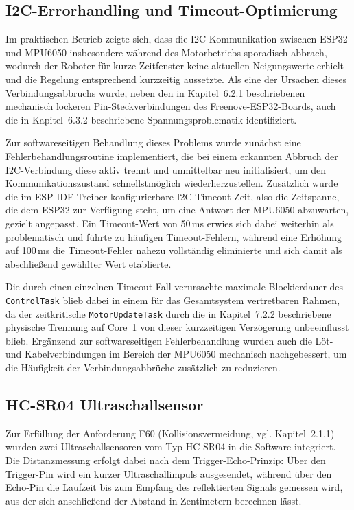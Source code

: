\documentclass[12pt,ngerman,numbers=noenddot,abstracton,headsepline]{scrreprt}
\begin{document}
\subsection{I2C-Errorhandling und Timeout-Optimierung}
\label{subsec:i2c_errorhandling}

Im praktischen Betrieb zeigte sich, dass die I2C-Kommunikation zwischen ESP32 und MPU6050 insbesondere während des Motorbetriebs sporadisch abbrach, wodurch der Roboter für kurze Zeitfenster keine aktuellen Neigungswerte erhielt und die Regelung entsprechend kurzzeitig aussetzte. Als eine der Ursachen dieses Verbindungsabbruchs wurde, neben den in Kapitel~6.2.1 beschriebenen mechanisch lockeren Pin-Steckverbindungen des Freenove-ESP32-Boards, auch die in Kapitel~6.3.2 beschriebene Spannungsproblematik identifiziert.

Zur softwareseitigen Behandlung dieses Problems wurde zunächst eine Fehlerbehandlungsroutine implementiert, die bei einem erkannten Abbruch der I2C-Verbindung diese aktiv trennt und unmittelbar neu initialisiert, um den Kommunikationszustand schnellstmöglich wiederherzustellen. Zusätzlich wurde die im ESP-IDF-Treiber konfigurierbare I2C-Timeout-Zeit, also die Zeitspanne, die dem ESP32 zur Verfügung steht, um eine Antwort der MPU6050 abzuwarten, gezielt angepasst. Ein Timeout-Wert von 50\,ms erwies sich dabei weiterhin als problematisch und führte zu häufigen Timeout-Fehlern, während eine Erhöhung auf 100\,ms die Timeout-Fehler nahezu vollständig eliminierte und sich damit als abschließend gewählter Wert etablierte.

Die durch einen einzelnen Timeout-Fall verursachte maximale Blockierdauer des \texttt{ControlTask} blieb dabei in einem für das Gesamtsystem vertretbaren Rahmen, da der zeitkritische \texttt{MotorUpdateTask} durch die in Kapitel~7.2.2 beschriebene physische Trennung auf Core~1 von dieser kurzzeitigen Verzögerung unbeeinflusst blieb. Ergänzend zur softwareseitigen Fehlerbehandlung wurden auch die Löt- und Kabelverbindungen im Bereich der MPU6050 mechanisch nachgebessert, um die Häufigkeit der Verbindungsabbrüche zusätzlich zu reduzieren.

\subsection{HC-SR04 Ultraschallsensor}
\label{subsec:hcsr04}

Zur Erfüllung der Anforderung F60 (Kollisionsvermeidung, vgl. Kapitel~2.1.1) wurden zwei Ultraschallsensoren vom Typ HC-SR04 in die Software integriert. Die Distanzmessung erfolgt dabei nach dem Trigger-Echo-Prinzip: Über den Trigger-Pin wird ein kurzer Ultraschallimpuls ausgesendet, während über den Echo-Pin die Laufzeit bis zum Empfang des reflektierten Signals gemessen wird, aus der sich anschließend der Abstand in Zentimetern berechnen lässt.
\end{document}
